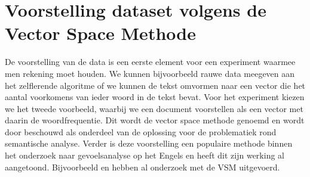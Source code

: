 \section{Voorstelling dataset volgens de Vector Space Methode}\label{Voorstelling dataset}
%
De voorstelling van de data is een eerste element voor een experiment waarmee men rekening moet houden. We kunnen bijvoorbeeld rauwe data meegeven aan het zelflerende algoritme of we kunnen de tekst omvormen naar een vector die het aantal voorkomens van ieder woord in de tekst bevat. Voor het experiment kiezen we het tweede voorbeeld, waarbij we een document voorstellen als een vector met daarin de woordfrequentie. Dit wordt de vector space methode genoemd en wordt door \cite{turney2010frequency} beschouwd als onderdeel van de oplossing voor de problematiek rond semantische analyse. Verder is deze voorstelling een populaire methode binnen het onderzoek naar gevoelsanalyse op het Engels en heeft dit zijn werking al aangetoond. Bijvoorbeeld \cite{pang2002thumbs} en \cite{maas-EtAl:2011:ACL-HLT2011} hebben al onderzoek met de VSM uitgevoerd.

